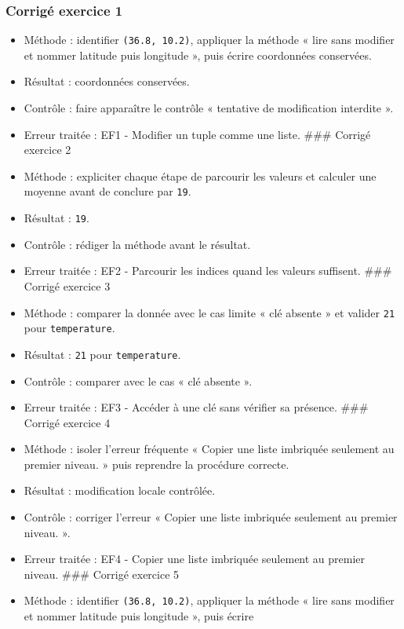 \subsubsection{Corrigé exercice 1}

\begin{itemize}
\tightlist
\item
  Méthode : identifier \texttt{(36.8,\ 10.2)}, appliquer la méthode «
  lire sans modifier et nommer latitude puis longitude », puis écrire
  coordonnées conservées.
\item
  Résultat : coordonnées conservées.
\item
  Contrôle : faire apparaître le contrôle « tentative de modification
  interdite ».
\item
  Erreur traitée : EF1 - Modifier un tuple comme une liste. \#\#\#
  Corrigé exercice 2
\item
  Méthode : expliciter chaque étape de parcourir les valeurs et calculer
  une moyenne avant de conclure par \texttt{19}.
\item
  Résultat : \texttt{19}.
\item
  Contrôle : rédiger la méthode avant le résultat.
\item
  Erreur traitée : EF2 - Parcourir les indices quand les valeurs
  suffisent. \#\#\# Corrigé exercice 3
\item
  Méthode : comparer la donnée avec le cas limite « clé absente » et
  valider \texttt{21} pour \texttt{temperature}.
\item
  Résultat : \texttt{21} pour \texttt{temperature}.
\item
  Contrôle : comparer avec le cas « clé absente ».
\item
  Erreur traitée : EF3 - Accéder à une clé sans vérifier sa présence.
  \#\#\# Corrigé exercice 4
\item
  Méthode : isoler l'erreur fréquente « Copier une liste imbriquée
  seulement au premier niveau. » puis reprendre la procédure correcte.
\item
  Résultat : modification locale contrôlée.
\item
  Contrôle : corriger l'erreur « Copier une liste imbriquée seulement au
  premier niveau. ».
\item
  Erreur traitée : EF4 - Copier une liste imbriquée seulement au premier
  niveau. \#\#\# Corrigé exercice 5
\item
  Méthode : identifier \texttt{(36.8,\ 10.2)}, appliquer la méthode «
  lire sans modifier et nommer latitude puis longitude », puis écrire

\end{itemize}
